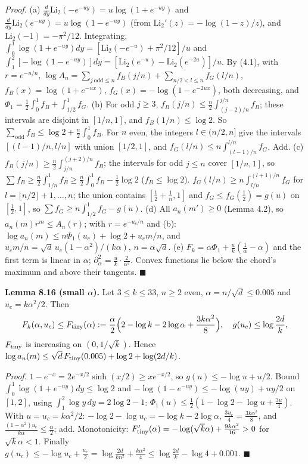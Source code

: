 \emph{Proof.} (a) \(\frac d{dy}\mathrm{Li}_2(-e^{-uy})=u\log(1+e^{-uy})\) and \(\frac d{dy}\mathrm{Li}_2(e^{-uy})=u\log(1-e^{-uy})\) (from \(\mathrm{Li}_2'(z)=-\log(1-z)/z\)), and \(\mathrm{Li}_2(-1)=-\pi^2/12\). Integrating, \(\int_0^1\log(1+e^{-uy})dy=[\mathrm{Li}_2(-e^{-u})+\pi^2/12]/u\) and \(\int_1^2[-\log(1-e^{-uy})]dy=[\mathrm{Li}_2(e^{-u})-\mathrm{Li}_2(e^{-2u})]/u\).
By (4.1), with \(r=e^{-u/n}\), \(\log A_n=\sum_{j\ \mathrm{odd}\le n}f_B(j/n)+\sum_{n/2<l\le n}f_G(l/n)\), \(f_B(x)=\log(1+e^{-ux})\), \(f_G(x)=-\log(1-e^{-2ux})\), both decreasing, and \(\Phi_1=\frac12\int_0^1f_B+\int_{1/2}^1f_G\).
(b) For odd \(j\ge3\), \(f_B(j/n)\le\frac n2\int_{(j-2)/n}^{j/n}f_B\); these intervals are disjoint in \([1/n,1]\), and \(f_B(1/n)\le\log2\). So \(\sum_{\mathrm{odd}}f_B\le\log2+\frac n2\int_0^1f_B\). For \(n\) even, the integers \(l\in(n/2,n]\) give the intervals \([(l-1)/n,l/n]\) with union \([1/2,1]\), and \(f_G(l/n)\le n\int_{(l-1)/n}^{l/n}f_G\). Add.
(c) \(f_B(j/n)\ge\frac n2\int_{j/n}^{(j+2)/n}f_B\); the intervals for odd \(j\le n\) cover \([1/n,1]\), so \(\sum f_B\ge\frac n2\int_{1/n}^1f_B\ge\frac n2\int_0^1f_B-\frac12\log2\) (\(f_B\le\log2\)). \(f_G(l/n)\ge n\int_{l/n}^{(l+1)/n}f_G\) for \(l=\lfloor n/2\rfloor+1,\dots,n\); the union contains \([\frac12+\frac1n,1]\) and \(f_G\le f_G(\frac12)=g(u)\) on \([\frac12,1]\), so \(\sum f_G\ge n\int_{1/2}^1f_G-g(u)\).
(d) All \(a_n(m')\ge0\) (Lemma 4.2), so \(a_n(m)r^m\le A_n(r)\); with \(r=e^{-u_c/n}\) and (b): \(\log a_n(m)\le n\Phi_1(u_c)+\log2+u_cm/n\), and \(u_cm/n=\sqrt d\,u_c(1-\alpha^2)/(k\alpha)\), \(n=\alpha\sqrt d\).
(e) \(F_k=\alpha\Phi_1+\frac uk(\frac1\alpha-\alpha)\) and the first term is linear in \(\alpha\); \(\partial_\alpha^2=\frac uk\cdot\frac2{\alpha^3}\). Convex functions lie below the chord's maximum and above their tangents. \(\blacksquare\)

\textbf{Lemma 8.16 (small \(\alpha\)).} Let \(3\le k\le33\), \(n\ge2\) even, \(\alpha=n/\sqrt d\le0.005\) and \(u_c=k\alpha^2/2\). Then
\[F_k(\alpha,u_c)\le F_{\rm tiny}(\alpha):=\frac\alpha2\Bigl(2-\log k-2\log\alpha+\frac{3k\alpha^2}8\Bigr),\quad g(u_c)\le\log\frac{2d}k,\]
\(F_{\rm tiny}\) is increasing on \((0,1/\sqrt k)\). Hence \(\log a_n(m)\le\sqrt d\,F_{\rm tiny}(0.005)+\log2+\log(2d/k)\).

\emph{Proof.} \(1-e^{-x}=2e^{-x/2}\sinh(x/2)\ge xe^{-x/2}\), so \(g(u)\le-\log u+u/2\). Bound \(\int_0^1\log(1+e^{-uy})dy\le\log2\) and \(-\log(1-e^{-uy})\le-\log(uy)+uy/2\) on \([1,2]\), using \(\int_1^2\log y\,dy=2\log2-1\): \(\Phi_1(u)\le\frac12(1-\log2-\log u+\frac{3u}4)\). With \(u=u_c=k\alpha^2/2\): \(-\log2-\log u_c=-\log k-2\log\alpha\), \(\frac{3u_c}4=\frac{3k\alpha^2}8\), and \(\frac{(1-\alpha^2)u_c}{k\alpha}\le\frac\alpha2\); add. Monotonicity: \(F_{\rm tiny}'(\alpha)=-\log(\sqrt k\alpha)+\frac{9k\alpha^2}{16}>0\) for \(\sqrt k\alpha<1\). Finally \(g(u_c)\le-\log u_c+\frac{u_c}2=\log\frac{2d}{kn^2}+\frac{k\alpha^2}4\le\log\frac{2d}k-\log4+0.001\). \(\blacksquare\)

